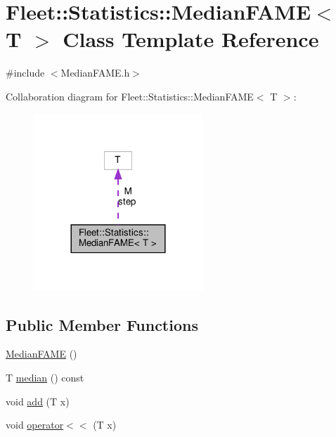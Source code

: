 \hypertarget{class_fleet_1_1_statistics_1_1_median_f_a_m_e}{}\section{Fleet\+:\+:Statistics\+:\+:Median\+F\+A\+ME$<$ T $>$ Class Template Reference}
\label{class_fleet_1_1_statistics_1_1_median_f_a_m_e}


{\ttfamily \#include $<$Median\+F\+A\+M\+E.\+h$>$}



Collaboration diagram for Fleet\+:\+:Statistics\+:\+:Median\+F\+A\+ME$<$ T $>$\+:\nopagebreak
\begin{figure}[H]
\begin{center}
\leavevmode
\includegraphics[width=180pt]{class_fleet_1_1_statistics_1_1_median_f_a_m_e__coll__graph}
\end{center}
\end{figure}
\subsection*{Public Member Functions}
\begin{DoxyCompactItemize}
\item 
\hyperlink{class_fleet_1_1_statistics_1_1_median_f_a_m_e_a0be08191b9c7efbadc85e32cf650fe2c}{Median\+F\+A\+ME} ()
\item 
T \hyperlink{class_fleet_1_1_statistics_1_1_median_f_a_m_e_a9ebd0ea21583d80bd9ca2f3cd6f06941}{median} () const
\item 
void \hyperlink{class_fleet_1_1_statistics_1_1_median_f_a_m_e_a676e90f267fc315e67416ec432944896}{add} (T x)
\item 
void \hyperlink{class_fleet_1_1_statistics_1_1_median_f_a_m_e_a5a81f46d3917cd67d5060eb88f7e6cc3}{operator$<$$<$} (T x)
\end{DoxyCompactItemize}
